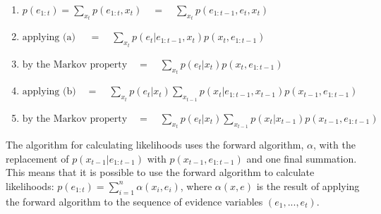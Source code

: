 \begin{center}
\end{center}


\begin{enumerate}

\item {$p(e_{1:t}) = \sum_{x_t}p(e_{1:t}, x_t) \quad = \quad \sum_{x_t}p({e_{1:t-1}, e_t, x_t}) $
}
\item {$\text{applying (a) } \quad= \quad
\sum_{x_t}{p(e_t | e_{1:t-1}, x_t)p(x_t, e_{1:t-1})}$
}
\item{$\text{by the Markov property} 
\quad = \quad \sum_{x_t}p(e_t | x_t)p(x_t, e_{1:t-1})$
}

\item{$\text{applying (b)} \quad =  \quad
\sum_{x_t}p(e_t | x_t) \sum_{x_{t-1}}p(x_t|e_{1:t-1}, x_{t-1}) p(x_{t-1},e_{1:t-1})$
}

\item{$\text{by the Markov property} \quad = \quad 
\sum_{x_t}{p(e_t | x_t)\sum_{x_{t-1}}p(x_t|x_{t-1}) p(x_{t-1},e_{1:t-1})}$
}

\end{enumerate}

The algorithm for calculating likelihoods uses the forward algorithm, $\alpha$, with the replacement of  $p(x_{t-1}|e_{1:t-1})$ with $p(x_{t-1}, e_{1:t-1})$ and one final summation. This means that it is possible to use the forward algorithm to calculate likelihoods: $p(e_{1:t}) = \sum_{i=1}^{n} \alpha(x_i, e_i)$, where $\alpha(x, e)$ is the result of applying the forward algorithm to the sequence of evidence variables $(e_1, ..., e_t)$.




